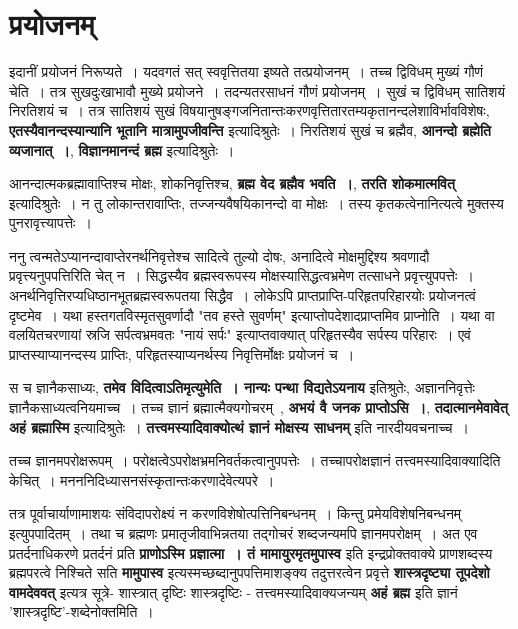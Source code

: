 \section{प्रयोजनम्}
	इदानीं प्रयोजनं निरूप्यते~। यदवगतं सत् स्ववृत्तितया इष्यते तत्प्रयोजनम्~। तच्च द्विविधम् मुख्यं गौणं चेति~। तत्र सुखदुःखाभावौ मुख्ये प्रयोजने~। तदन्यतरसाधनं गौणं प्रयोजनम्~। सुखं च द्विविधम् सातिशयं निरतिशयं च~। तत्र सातिशयं सुखं विषयानुषङ्गजनितान्तःकरणवृत्तितारतम्यकृतानन्दलेशाविर्भावविशेषः, {\bfseries एतस्यैवानन्दस्यान्यानि भूतानि मात्रामुपजीवन्ति} इत्यादिश्रुतेः~। निरतिशयं सुखं च ब्रह्मैव, {\bfseries आनन्दो ब्रह्मेति व्यजानात्~।}, {\bfseries विज्ञानमानन्दं ब्रह्म} इत्यादिश्रुतेः~।\par
	आनन्दात्मकब्रह्मावाप्तिश्च मोक्षः, शोकनिवृत्तिश्च, {\bfseries ब्रह्म वेद ब्रह्मैव भवति~।}, {\bfseries तरति शोकमात्मवित्} इत्यादिश्रुतेः~। न तु लोकान्तरावाप्तिः, तज्जन्यवैषयिकानन्दो वा मोक्षः~। तस्य कृतकत्वेनानित्यत्वे मुक्तस्य पुनरावृत्त्यापत्तेः~। \par
	ननु त्वन्मतेऽप्यानन्दावाप्तेरनर्थनिवृत्तेश्च सादित्वे तुल्यो दोषः, अनादित्वे मोक्षमुद्दिश्य श्रवणादौ प्रवृत्त्यनुपपत्तिरिति चेत् न~। सिद्धस्यैव ब्रह्मस्वरूपस्य मोक्षस्यासिद्धत्वभ्रमेण तत्साधने प्रवृत्त्युपपत्तेः~। अनर्थनिवृत्तिरप्यधिष्ठानभूतब्रह्मस्वरूपतया सिद्धैव~। लोकेऽपि प्राप्तप्राप्ति-परिहृतपरिहारयोः प्रयोजनत्वं दृष्टमेव~। यथा हस्तगतविस्मृतसुवर्णादौ "तव हस्ते सुवर्णम्" इत्याप्तोपदेशादप्राप्तमिव प्राप्नोति~। यथा वा वलयितचरणायां स्रजि सर्पत्वभ्रमवतः "नायं सर्पः" इत्याप्तवाक्यात् परिहृतस्यैव सर्पस्य परिहारः~। एवं प्राप्तस्याप्यानन्दस्य प्राप्तिः, परिहृतस्याप्यनर्थस्य निवृत्तिर्मोक्षः प्रयोजनं च~।\par
	स च ज्ञानैकसाध्यः, {\bfseries तमेव विदित्वाऽतिमृत्युमेति~। नान्यः पन्था विद्यतेऽयनाय} इतिश्रुतेः, अज्ञाननिवृत्तेः ज्ञानैकसाध्यत्वनियमाच्च~। तच्च ज्ञानं ब्रह्मात्मैक्यगोचरम्~, {\bfseries अभयं वै जनक प्राप्तोऽसि~।}, {\bfseries तदात्मानमेवावेत् अहं ब्रह्मास्मि} इत्यादिश्रुतेः~। {\bfseries तत्त्वमस्यादिवाक्योत्थं ज्ञानं मोक्षस्य साधनम्} इति नारदीयवचनाच्च~।\par
	तच्च ज्ञानमपरोक्षरूपम्~। परोक्षत्वेऽपरोक्षभ्रमनिवर्तकत्वानुपपत्तेः~। तच्चापरोक्षज्ञानं तत्त्वमस्यादिवाक्यादिति केचित्~। मनननिदिध्यासनसंस्कृतान्तःकरणादेवेत्यपरे~।\par
	तत्र पूर्वाचार्याणामाशयः संविदापरोक्ष्यं न करणविशेषोत्पत्तिनिबन्धनम्~। किन्तु प्रमेयविशेषनिबन्धनम् इत्युपपादितम्~। तथा च ब्रह्मणः प्रमातृजीवाभिन्नतया तद्गोचरं शब्दजन्यमपि ज्ञानमपरोक्षम्~। अत एव प्रतर्दनाधिकरणे प्रतर्दनं प्रति {\bfseries प्राणोऽस्मि प्रज्ञात्मा~। तं मामायुरमृतमुपास्व} इति इन्द्रप्रोक्तवाक्ये प्राणशब्दस्य ब्रह्मपरत्वे निश्चिते सति {\bfseries मामुपास्व} इत्यस्मच्छब्दानुपपत्तिमाशङ्क्य तदुत्तरत्वेन प्रवृत्ते {\bfseries शास्त्रदृष्ट्या तूपदेशो वामदेववत्} इत्यत्र सूत्रे- शास्त्रात् दृष्टिः शास्त्रदृष्टिः - तत्त्वमस्यादिवाक्यजन्यम् {\bfseries अहं ब्रह्म} इति ज्ञानं 'शास्त्रदृष्टि'-शब्देनोक्तमिति~।\par
